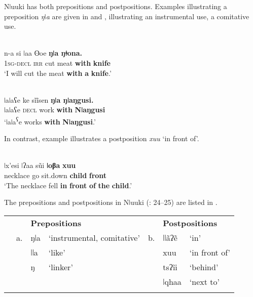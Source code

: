 \documentclass[output=paper]{langsci/langscibook}
\begin{document}
Nǀuuki has both prepositions and postpositions. Examples illustrating a preposition \textit{ŋǀa} are given in  and ,  illustrating an instrumental use,  a comitative use.

\ea\label{ex:dryer:}
\\
\gll n-a  si  ǀaa  ʘoe  \textbf{ŋǀa  ŋǂona.}\\
       \textsc{1sg-decl}  \textsc{irr}  cut  meat  \textbf{with}  \textbf{knife}  \\
\glt ‘I will cut the meat \textbf{with} \textbf{a} \textbf{knife}.’  
\z

\ea\label{ex:dryer:}
\\
\gll ǀaǀaʕe  ke  sĩĩsen  \textbf{ŋǀa  ŋǀaŋgusi.}\\
       ǀaǀaʕe  \textsc{decl}  work  \textbf{with}  \textbf{Nǀaŋgusi}  \\
\glt ‘ǀaǀa\textsuperscript{ʕ}e works \textbf{with} \textbf{Nǀaŋgusi}.’  
\z

In contrast, example  illustrates a postposition \textit{xuu} ‘in front of’.

\ea\label{ex:dryer:}
\\
\gll ǀx’esi  ǀʔaa  s\~ui  \textbf{ǀoβa}  \textbf{xuu}\\
       necklace  go  sit.down  \textbf{child}  \textbf{front}  \\
\glt ‘The necklace fell \textbf{in} \textbf{front} \textbf{of} \textbf{the} \textbf{child}.’ 
\z

The prepositions and postpositions in Nǀuuki (\citealt{CollinsNamaseb2011}: 24–25) are listed in .


\begin{table}
\begin{tabularx}{\textwidth}{XXXXXXX} 
\lsptoprule
&  & \multicolumn{2}{X}{\bfseries Prepositions} &  & \multicolumn{2}{X}{\bfseries Postpositions}\\
& a. & ŋǀa & ‘instrumental, comitative’ & b. & ǀǀãʔẽ & ‘in’\\
&  & ǀǀa & ‘like’ &  & xuu & ‘in front of’\\
&  & ŋ & ‘linker’ &  & tsʔĩi & ‘behind’\\
&  &  &  &  & ǀqhaa & ‘next to’\\
\lspbottomrule
\end{tabularx}
\end{table}
\end{document}
